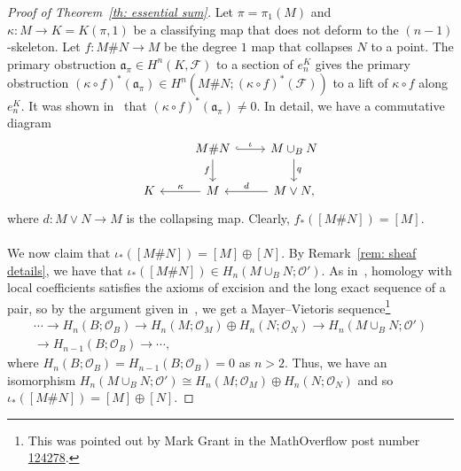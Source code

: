 \documentclass[amscd,amssymb,verbatim,11pt]{amsart}
\theoremstyle{plain}
\theoremstyle{definition}
\DeclareMathOperator{\dcat}{{\mathsf{dcat}}}
\newcommand{\F}{\mathcal{F}}
\def\scr{\mathcal}
\def\O{{\scr O}}
\begin{document}
\begin{proof}[Proof of Theorem~\ref{th: essential sum}]
    Let $\pi=\pi_1(M)$ and $\kappa\colon M\to K=K(\pi,1)$ be a classifying map that does not deform to the $(n-1)$-skeleton. Let $f\colon M\# N\to M$ be the degree $1$ map that collapses $N$ to a point. 
The primary obstruction $\mathfrak{a}_\pi \in H^n(K,\F)$ to a section of $e_n^K$ gives the primary obstruction $(\kappa\circ f)^*(\mathfrak{a}_\pi)\in H^n(M\# N;(\kappa\circ f)^*(\F))$ to a lift of $\kappa\circ f$ along $e^K_n$. It was shown in~\cite[Section 4]{Ja2} that $(\kappa\circ f)^*(\mathfrak{a}_\pi)\ne 0$. In detail, we have a commutative diagram
\[
\begin{tikzcd}[contains/.style = {draw=none,"\in" description,sloped}]
&
M\# N \arrow[hookrightarrow]{r}{\iota} \arrow[swap]{d}{f} 
& 
M\cup_B N \arrow{d}{q}
\\
K
&
M   \arrow{l}[swap]{\kappa}
& 
M \vee N, \arrow{l}[swap]{d}
\end{tikzcd}
\]
where $d\colon M\vee N\to M$ is the collapsing map. Clearly, $f_*([M\#N])=[M]$. 
\\
\\

We now claim that $\iota_*([M\#N]) = [M]\oplus [N]$. By Remark~\ref{rem: sheaf details}, we have that $\iota_*([M\#N])\in H_n(M\cup_BN;\O')$. As in~\cite[Chapter~VI]{Wh}, homology with local coefficients satisfies the axioms of excision and the long exact sequence of a pair, so by the argument given in~\cite[Chapter~2,~Section~3]{Ha}, we get a Mayer--Vietoris sequence\hspace{0.3mm}\footnote{\hspace{0.3mm}This was pointed out by Mark Grant in the MathOverflow post number \href{https://mathoverflow.net/questions/124278/mayer-vietoris-sequence-in-homology-with-local-coefficients}{124278}.}
\begin{multline*}
    \cdots\to H_n(B;\O_B)\to H_n(M;\O_M)\oplus H_n(N;\O_N) \to H_n(M\cup_BN;\O')
    \\
    \to H_{n-1}(B;\O_B)\to\cdots,
\end{multline*}
where $H_n(B;\O_B)=H_{n-1}(B;\O_B)=0$ as $n>2$. Thus, we have an isomorphism $H_n(M\cup_BN;\O')\cong H_n(M;\O_M)\oplus H_n(N;\O_N)$ and so $\iota_*([M\#N]) = [M]\oplus [N]$. 


\end{proof}
\end{document}
